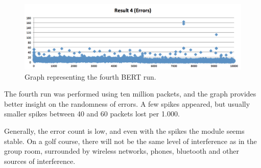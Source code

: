 \begin{figure}[h!]
\hspace*{-2cm}
\includegraphics[width=1.3\textwidth]{chapters/test/figures/res4.png}
\caption{Graph representing the fourth BERT run.}
\label{fig:bert3}
\end{figure}

The fourth run was performed using ten million packets, and the graph provides better insight on the randomness of errors. A few spikes appeared, but usually smaller spikes between 40 and 60 packets lost per 1.000.

Generally, the error count is low, and even with the spikes the module seems stable. On a golf course, there will not be the same level of interference as in the group room, surrounded by wireless networks, phones, bluetooth and other sources of interference.

